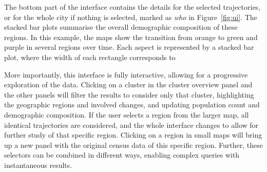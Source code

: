 The bottom part of the interface contains the details for the selected
trajectories, or for the whole city if nothing is selected, marked as \emph{who}
in Figure~\ref{fig:ui}. The stacked bar plots summarise the overall demographic
composition of these regions. In this example, the maps show the transition from
orange to green and purple in several regions over time. Each aspect is
represented by a stacked bar plot, where the width of each rectangle corresponds
to 

More importantly, this interface is fully interactive, allowing for a
progressive exploration of the data. Clicking on a cluster in the cluster
overview panel and the other panels will filter the results to consider only
that cluster, highlighting the geographic regions and involved changes, and
updating population count and demographic composition. If the user selects a
region from the larger map, all identical trajectories are considered, and the
whole interface changes to allow for further study of that specific region.
Clicking on a region in small maps will bring up a new panel with the original
census data of this specific region. Further, these selectors can be combined in
different ways, enabling complex queries with instantaneous results.
